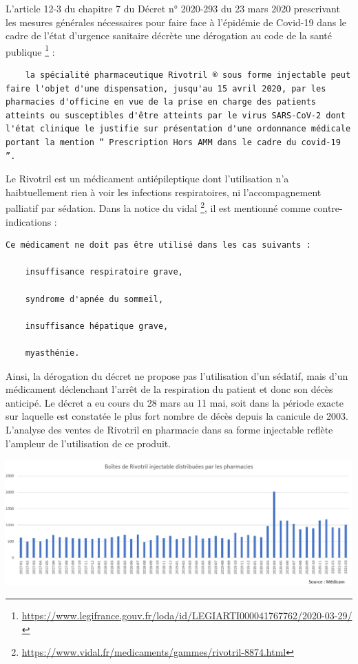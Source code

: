 \documentclass[
]{article}
\begin{document}
L'article 12-3 du chapitre 7 du Décret n° 2020-293 du 23 mars 2020
prescrivant les mesures générales nécessaires pour faire face à
l'épidémie de Covid-19 dans le cadre de l'état d'urgence sanitaire
décrète une dérogation au code de la santé publique \footnote{\url{https://www.legifrance.gouv.fr/loda/id/LEGIARTI000041767762/2020-03-29/}}
:

\begin{verbatim}
    la spécialité pharmaceutique Rivotril ® sous forme injectable peut faire l'objet d'une dispensation, jusqu'au 15 avril 2020, par les pharmacies d'officine en vue de la prise en charge des patients atteints ou susceptibles d'être atteints par le virus SARS-CoV-2 dont l'état clinique le justifie sur présentation d'une ordonnance médicale portant la mention “ Prescription Hors AMM dans le cadre du covid-19 ”.
\end{verbatim}

Le Rivotril est un médicament antiépileptique dont l'utilisation n'a
haibtuellement rien à voir les infections respiratoires, ni
l'accompagnement palliatif par sédation. Dans la notice du vidal
\footnote{\url{https://www.vidal.fr/medicaments/gammes/rivotril-8874.html}},
il est mentionné comme contre-indications :

\begin{verbatim}
Ce médicament ne doit pas être utilisé dans les cas suivants :

    insuffisance respiratoire grave,

    syndrome d'apnée du sommeil,

    insuffisance hépatique grave,

    myasthénie.
\end{verbatim}

Ainsi, la dérogation du décret ne propose pas l'utilisation d'un
sédatif, mais d'un médicament déclenchant l'arrêt de la respiration du
patient et donc son décès anticipé. Le décret a eu cours du 28 mars au
11 mai, soit dans la période exacte sur laquelle est constatée le plus
fort nombre de décès depuis la canicule de 2003. L'analyse des ventes de
Rivotril en pharmacie dans sa forme injectable reflète l'ampleur de
l'utilisation de ce produit.

\includegraphics[width=10.41667in,height=\textheight]{data/images/rivotril.png}
\end{document}
